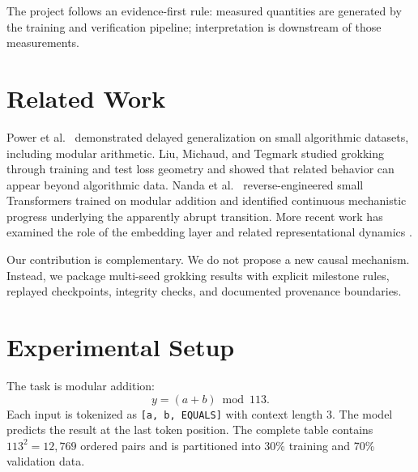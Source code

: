 \documentclass[11pt]{article}
\begin{document}
The project follows an evidence-first rule: measured quantities are generated by the training and verification pipeline; interpretation is downstream of those measurements.

\section{Related Work}
Power et al.\ \cite{power2022grokking} demonstrated delayed generalization on small algorithmic datasets, including modular arithmetic. Liu, Michaud, and Tegmark \cite{liu2022omnigrok} studied grokking through training and test loss geometry and showed that related behavior can appear beyond algorithmic data. Nanda et al.\ \cite{nanda2023progress} reverse-engineered small Transformers trained on modular addition and identified continuous mechanistic progress underlying the apparently abrupt transition. More recent work has examined the role of the embedding layer and related representational dynamics \cite{alquboj2025embedding}.

Our contribution is complementary. We do not propose a new causal mechanism. Instead, we package multi-seed grokking results with explicit milestone rules, replayed checkpoints, integrity checks, and documented provenance boundaries.

\section{Experimental Setup}
The task is modular addition:
\[
y=(a+b)\bmod 113.
\]
Each input is tokenized as \texttt{[a, b, EQUALS]} with context length 3. The model predicts the result at the last token position. The complete table contains $113^2=12{,}769$ ordered pairs and is partitioned into 30\% training and 70\% validation data.
\end{document}

